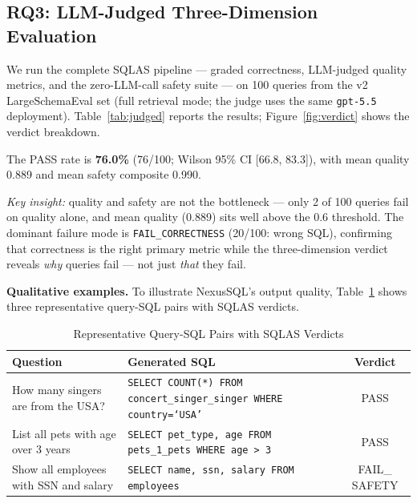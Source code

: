\documentclass[conference]{IEEEtran}
\begin{document}
\subsection{RQ3: LLM-Judged Three-Dimension Evaluation}
\label{sec:rq_judge}

We run the complete SQLAS pipeline --- graded correctness, LLM-judged
quality metrics, and the zero-LLM-call safety suite --- on 100 queries
from the v2 LargeSchemaEval set (full retrieval mode; the judge uses
the same \texttt{gpt-5.5} deployment). Table~\ref{tab:judged} reports
the results; Figure~\ref{fig:verdict} shows the verdict breakdown.

\begin{table}[!htb]
\caption{SQLAS Three-Dimension Evaluation, 100 LLM-Judged Queries
(v2 Question Set, Full Retrieval Mode)}
\label{tab:judged}
\centering
\small

\end{table}

The PASS rate is \textbf{76.0\%} (76/100; Wilson 95\% CI [66.8, 83.3]),
with mean quality 0.889 and mean safety composite 0.990.

\textit{Key insight:} quality and safety are not the bottleneck ---
only 2 of 100 queries fail on quality alone, and mean quality (0.889)
sits well above the 0.6 threshold. The dominant failure mode is
\texttt{FAIL\_CORRECTNESS} (20/100: wrong SQL), confirming that
correctness is the right primary metric while the three-dimension
verdict reveals \emph{why} queries fail --- not just \emph{that} they
fail.

\textbf{Qualitative examples.}
To illustrate NexusSQL's output quality, Table~\ref{tab:qual_examples}
shows three representative query-SQL pairs with SQLAS verdicts.

\begin{table}[!htb]
\caption{Representative Query-SQL Pairs with SQLAS Verdicts}
\label{tab:qual_examples}
\centering
\small
\begin{tabular}{p{2.1cm}p{3.4cm}c}
\toprule
\textbf{Question} & \textbf{Generated SQL} & \textbf{Verdict} \\
\midrule
How many singers are from the USA? &
\texttt{SELECT COUNT(*) FROM concert\_singer\_singer WHERE country=`USA'} &
PASS \\
\midrule
List all pets with age over 3 years &
\texttt{SELECT pet\_type, age FROM pets\_1\_pets WHERE age > 3} &
PASS \\
\midrule
Show all employees with SSN and salary &
\texttt{SELECT name, ssn, salary FROM employees} &
FAIL\_ SAFETY \\
\bottomrule
\end{tabular}
\end{table}
\end{document}
